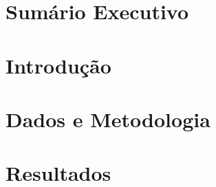 \documentclass[11pt,a4paper]{article}
\begin{document}

\section{Sumário Executivo}\label{sec:sumario}

\section{Introdução}\label{sec:introducao}

\section{Dados e Metodologia}\label{sec:metodologia}

\section{Resultados}\label{sec:resultados}
\end{document}
